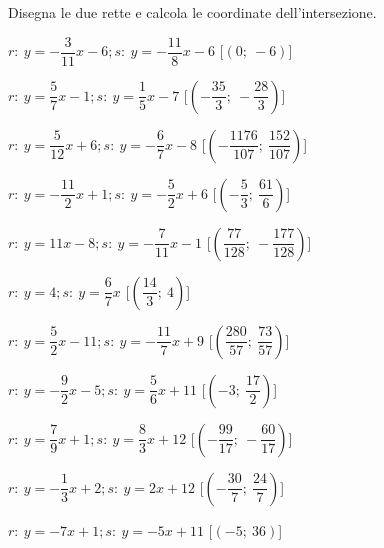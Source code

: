 \begin{esercizio}\label{ese:}
 Disegna le due rette e calcola le coordinate dell'intersezione.
 \begin{enumeratea}
  \item  $r:~y = -\dfrac{3}{11} x -6; s:~y = -\dfrac{11}{8} x -6$ \hfill 
   [$\left(0;~-6\right)$]
  \item  $r:~y = \dfrac{5}{7} x -1; s:~y = \dfrac{1}{5} x -7$ \hfill 
   [$\left(-\dfrac{35}{3};~-\dfrac{28}{3}\right)$]
  \item  $r:~y = \dfrac{5}{12} x +6; s:~y = -\dfrac{6}{7} x -8$ \hfill 
   [$\left(-\dfrac{1176}{107};~\dfrac{152}{107}\right)$]
  \item  $r:~y = -\dfrac{11}{2} x +1; s:~y = -\dfrac{5}{2} x +6$ \hfill 
   [$\left(-\dfrac{5}{3};~\dfrac{61}{6}\right)$]
  \item  $r:~y = 11 x -8; s:~y = -\dfrac{7}{11} x -1$ \hfill 
   [$\left(\dfrac{77}{128};~-\dfrac{177}{128}\right)$]
  \item  $r:~y = 4; s:~y = \dfrac{6}{7} x $ \hfill 
   [$\left(\dfrac{14}{3};~4\right)$]
  \item  $r:~y = \dfrac{5}{2} x -11; s:~y = -\dfrac{11}{7} x +9$ \hfill 
   [$\left(\dfrac{280}{57};~\dfrac{73}{57}\right)$]
  \item  $r:~y = -\dfrac{9}{2} x -5; s:~y = \dfrac{5}{6} x +11$ \hfill 
   [$\left(-3;~\dfrac{17}{2}\right)$]
  \item  $r:~y = \dfrac{7}{9} x +1; s:~y = \dfrac{8}{3} x +12$ \hfill 
   [$\left(-\dfrac{99}{17};~-\dfrac{60}{17}\right)$]
  \item  $r:~y = -\dfrac{1}{3} x +2; s:~y = 2 x +12$ \hfill 
   [$\left(-\dfrac{30}{7};~\dfrac{24}{7}\right)$]
  \item  $r:~y = -7 x +1; s:~y = -5 x +11$ \hfill 
   [$\left(-5;~36\right)$]
 \end{enumeratea}
\end{esercizio}


